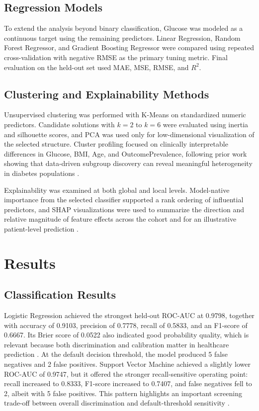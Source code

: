 \documentclass[conference]{IEEEtran}
\begin{document}
\subsection{Regression Models}
To extend the analysis beyond binary classification, Glucose was modeled as a continuous target using the remaining predictors. Linear Regression, Random Forest Regressor, and Gradient Boosting Regressor were compared using repeated cross-validation with negative RMSE as the primary tuning metric. Final evaluation on the held-out set used MAE, MSE, RMSE, and $R^2$.

\subsection{Clustering and Explainability Methods}
Unsupervised clustering was performed with K-Means on standardized numeric predictors. Candidate solutions with $k=2$ to $k=6$ were evaluated using inertia and silhouette scores, and PCA was used only for low-dimensional visualization of the selected structure. Cluster profiling focused on clinically interpretable differences in Glucose, BMI, Age, and OutcomePrevalence, following prior work showing that data-driven subgroup discovery can reveal meaningful heterogeneity in diabetes populations \cite{cluster_diabetes}.

Explainability was examined at both global and local levels. Model-native importance from the selected classifier supported a rank ordering of influential predictors, and SHAP visualizations were used to summarize the direction and relative magnitude of feature effects across the cohort and for an illustrative patient-level prediction \cite{xai_healthcare,xai_shap,xai_ehr}.

\section{Results}

\subsection{Classification Results}
Logistic Regression achieved the strongest held-out ROC-AUC at 0.9798, together with accuracy of 0.9103, precision of 0.7778, recall of 0.5833, and an F1-score of 0.6667. Its Brier score of 0.0522 also indicated good probability quality, which is relevant because both discrimination and calibration matter in healthcare prediction \cite{calibration}. At the default decision threshold, the model produced 5 false negatives and 2 false positives. Support Vector Machine achieved a slightly lower ROC-AUC of 0.9747, but it offered the stronger recall-sensitive operating point: recall increased to 0.8333, F1-score increased to 0.7407, and false negatives fell to 2, albeit with 5 false positives. This pattern highlights an important screening trade-off between overall discrimination and default-threshold sensitivity \cite{calibration}.
\end{document}
